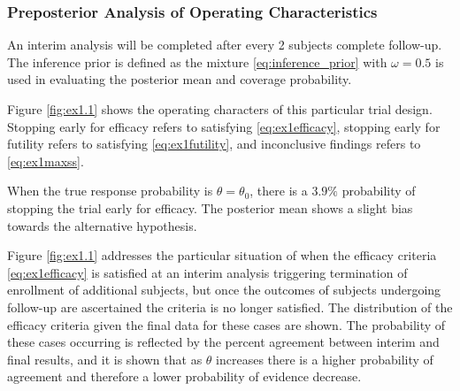 \documentclass[12pt]{article}
\begin{document}
\subsubsection{Preposterior Analysis of Operating Characteristics}\label{sec:ex1.1}
An interim analysis will be completed after every 2 subjects complete follow-up. The inference prior is defined as the mixture \eqref{eq:inference_prior} with $\omega=0.5$ is used in evaluating the posterior mean and coverage probability.

Figure \ref{fig:ex1.1} shows the operating characters of this particular trial design. Stopping early for efficacy refers to satisfying \eqref{eq:ex1efficacy}, stopping early for futility refers to satisfying \eqref{eq:ex1futility}, and inconclusive findings refers to \eqref{eq:ex1maxss}. 

When the true response probability is $\theta=\theta_0$, there is a $3.9\%$ probability of stopping the trial early for efficacy. The posterior mean shows a slight bias towards the alternative hypothesis.

Figure \ref{fig:ex1.1} addresses the particular situation of when the efficacy criteria \eqref{eq:ex1efficacy} is satisfied at an interim analysis triggering termination of enrollment of additional subjects, but once the outcomes of subjects undergoing follow-up are ascertained the criteria is no longer satisfied. The distribution of the efficacy criteria given the final data for these cases are shown. The probability of these cases occurring is reflected by the percent agreement between interim and final results, and it is shown that as $\theta$ increases there is a higher probability of agreement and therefore a lower probability of evidence decrease.
\end{document}
